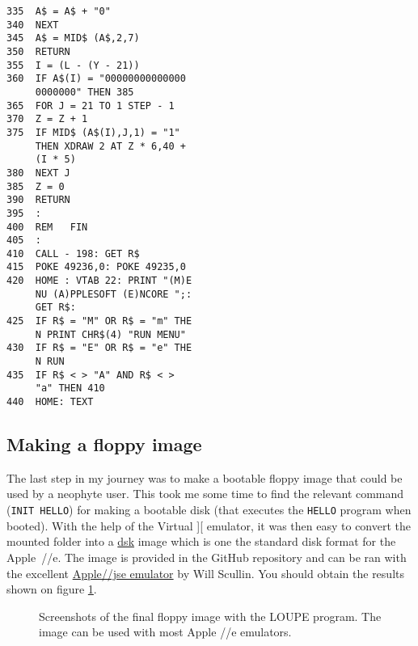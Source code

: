 \begin{minipage}{.325\textwidth}
\begin{tiny}
\begin{framed}
\begin{verbatim}
335  A$ = A$ + "0"
340  NEXT 
345  A$ = MID$ (A$,2,7)
350  RETURN 
355  I = (L - (Y - 21))
360  IF A$(I) = "00000000000000
     0000000" THEN 385
365  FOR J = 21 TO 1 STEP - 1
370  Z = Z + 1
375  IF MID$ (A$(I),J,1) = "1"
     THEN XDRAW 2 AT Z * 6,40 +
     (I * 5)
380  NEXT J
385  Z = 0
390  RETURN 
395  :
400  REM   FIN
405  :
410  CALL - 198: GET R$
415  POKE 49236,0: POKE 49235,0
420  HOME : VTAB 22: PRINT "(M)E
     NU (A)PPLESOFT (E)NCORE ";:
     GET R$:
425  IF R$ = "M" OR R$ = "m" THE
     N PRINT CHR$(4) "RUN MENU"
430  IF R$ = "E" OR R$ = "e" THE
     N RUN 
435  IF R$ < > "A" AND R$ < > 
     "a" THEN 410
440  HOME: TEXT

\end{verbatim}
\vspace{-2\baselineskip}
\end{framed}
\end{tiny}
\end{minipage}

\subsection*{Making a floppy image}

The last step in my journey was to make a bootable floppy image that could be
used by a neophyte user. This took me some time to find the relevant command
({\tt INIT HELLO}) for making a bootable disk (that executes the {\tt HELLO}
program when booted). With the help of the Virtual ][ emulator, it was then easy
to convert the mounted folder into
a \href{http://fileformats.archiveteam.org/wiki/DSK_(Apple_II)}{dsk} image
which is one the standard disk format for the Apple~//e. The image is provided
in the GitHub repository and can be ran with the excellent \href{https://www.scullinsteel.com/apple/e}{Apple//jse emulator} by Will Scullin. You should obtain the results shown on figure \ref{fig:disk-screenshots}.

\begin{figure}
{%
\fboxsep=0pt
\hfill
{}
\hfill
{}
}
\caption{Screenshots of the final floppy image with the LOUPE program. The image can be used with most Apple //e emulators.}
\label{fig:disk-screenshots}
\end{figure}


